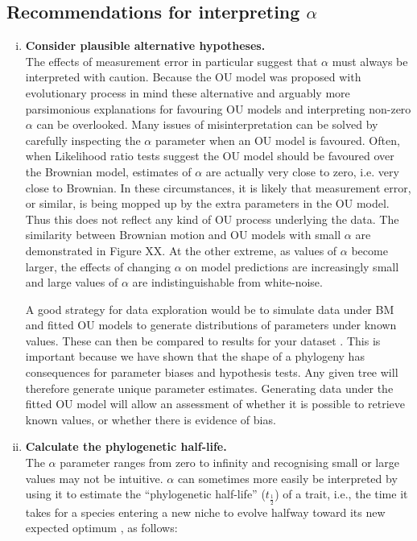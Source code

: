 \documentclass[a4paper,12pt]{article}
\begin{document}
  \subsection{Recommendations for interpreting $\alpha$}    
    \begin{enumerate}[(i)]
    \item \textbf{Consider plausible alternative hypotheses.}\\
    The effects of measurement error in particular suggest that $\alpha$ must always be interpreted with caution. 
    Because the OU model was proposed with evolutionary process in mind these alternative and arguably more parsimonious explanations for favouring OU models and interpreting non-zero $\alpha$ can be overlooked. 
    Many issues of misinterpretation can be solved by carefully inspecting the $\alpha$ parameter when an OU model is favoured. 
    Often, when Likelihood ratio tests suggest the OU model should be favoured over the Brownian model, estimates of $\alpha$ are actually very close to zero, i.e. very close to Brownian.
    In these circumstances, it is likely that measurement error, or similar, is being mopped up by the extra parameters in the OU model. 
    Thus this does not reflect any kind of OU process underlying the data. 
    The similarity between Brownian motion and OU models with small $\alpha$ are demonstrated in Figure XX. 
    At the other extreme, as values of $\alpha$ become larger, the effects of changing $\alpha$ on model predictions are increasingly small and large values of $\alpha$ are indistinguishable from white-noise.  
    
    A good strategy for data exploration would be to simulate data under BM and fitted OU models to generate distributions of parameters under known values. 
    These can then be compared to results for your dataset \citep[see][for a related approach]{slater2013robust}. 
    This is important because we have shown that the shape of a phylogeny has consequences for parameter biases and hypothesis tests. 
    Any given tree will therefore generate unique parameter estimates. 
    Generating data under the fitted OU model will allow an assessment of whether it is possible to retrieve known values, or whether there is evidence of bias. 
    
	  \item \textbf{Calculate the phylogenetic half-life.} \\
    The $\alpha$ parameter ranges from zero to infinity and recognising small or large values may not be intuitive. 
    $\alpha$ can sometimes more easily be interpreted by using it to estimate the ``phylogenetic half-life'' ($t_\frac{1}{2}$) of a trait, i.e., the time it takes for a species entering a new niche to evolve halfway toward its new expected optimum \citep{hansen1997stabilizing}, as follows:


\end{enumerate}
\end{document}
